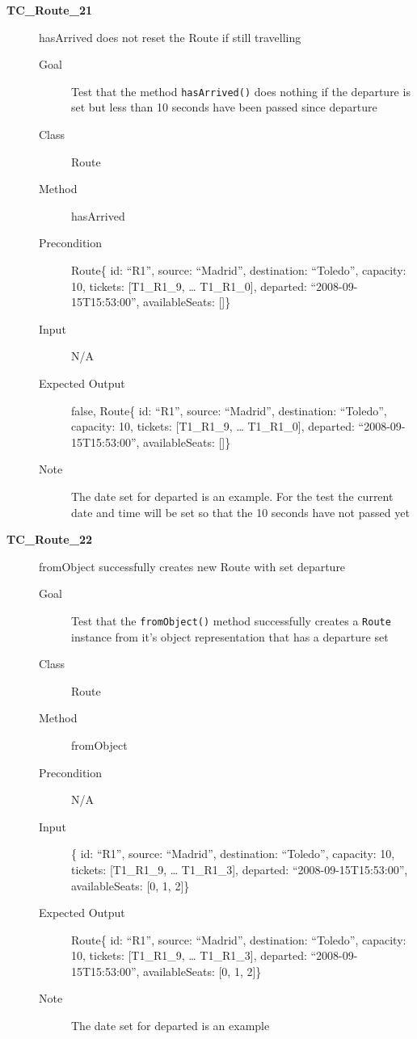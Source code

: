 \documentclass[11pt]{article}
\begin{document}
\begin{description}
\item[{\textbf{TC\_Route\_21}}] hasArrived does not reset the Route if still travelling
\begin{description}
\item[{Goal}] Test that the method \texttt{hasArrived()} does nothing if the departure is set but less than 10 seconds have been passed since departure
\item[{Class}] Route
\item[{Method}] hasArrived
\item[{Precondition}] Route\{ id: “R1”, source: “Madrid”, destination: “Toledo”, capacity: 10,  tickets: [T1\_R1\_9, … T1\_R1\_0], departed: “2008-09-15T15:53:00”, availableSeats: []\}
\item[{Input}] N/A
\item[{Expected Output}] false, Route\{ id: “R1”, source: “Madrid”, destination: “Toledo”, capacity: 10,  tickets: [T1\_R1\_9, … T1\_R1\_0], departed: “2008-09-15T15:53:00”, availableSeats: []\}
\item[{Note}] The date set for departed is an example. For the test the current date and time will be set so that the 10 seconds have not passed yet
\end{description}

\item[{\textbf{TC\_Route\_22}}] fromObject successfully creates new Route with set departure
\begin{description}
\item[{Goal}] Test that the \texttt{fromObject()} method successfully creates a \texttt{Route} instance from it's object representation that has a departure set
\item[{Class}] Route
\item[{Method}] fromObject
\item[{Precondition}] N/A
\item[{Input}] \{ id: “R1”, source: “Madrid”, destination: “Toledo”, capacity: 10,  tickets: [T1\_R1\_9, … T1\_R1\_3], departed: “2008-09-15T15:53:00”, availableSeats: [0, 1, 2]\}
\item[{Expected Output}] Route\{ id: “R1”, source: “Madrid”, destination: “Toledo”, capacity: 10,  tickets: [T1\_R1\_9, … T1\_R1\_3], departed: “2008-09-15T15:53:00”, availableSeats: [0, 1, 2]\}
\item[{Note}] The date set for departed is an example
\end{description}


\end{description}
\end{document}
